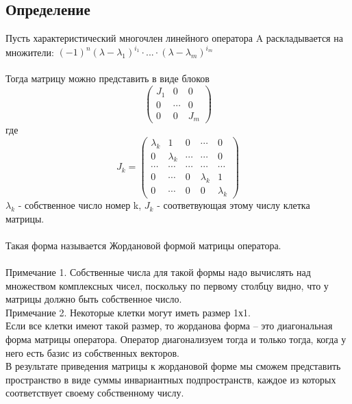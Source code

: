 \documentclass[12pt]{article}
\begin{document}
    \subsection{Определение}

    Пусть характеристический многочлен линейного оператора A раскладывается на множители:
    \((-1)^n(\lambda-\lambda_1)^{i_1}\cdot...\cdot(\lambda-\lambda_m)^{i_m}\)\\\\
    Тогда матрицу можно представить в виде блоков
    \[
        \begin{pmatrix}
            J_1 & 0      & 0   \\
            0   & \cdots & 0   \\
            0   & 0      & J_m
        \end{pmatrix}
    \] где
    \[
        J_k = \begin{pmatrix}
            \lambda_k & 1         & 0      & \cdots    & 0         \\
            0         & \lambda_k & \cdots & \cdots    & 0         \\
            \cdots    & \cdots    & \cdots & \cdots    & \cdots    \\
            0         & \cdots    & 0      & \lambda_k & 1         \\
            0         & \cdots    & 0      & 0         & \lambda_k
        \end{pmatrix}
    \]
$\lambda_k$ - собственное число номер k, $J_k$ - соответвующая этому числу клетка матрицы.\\\\
    Такая форма называется Жордановой формой матрицы оператора. \\\\
    Примечание 1. Собственные числа для такой формы надо вычислять над множеством комплексных чисел,
    поскольку по первому столбцу видно, что у матрицы должно быть собственное число. \\
    Примечание 2. Некоторые клетки могут иметь размер 1х1.\\
    Если все клетки имеют такой размер, то жорданова форма – это диагональная форма матрицы оператора.
    Оператор диагонализуем тогда и только тогда, когда у него есть базис из собственных векторов.\\
    В результате приведения матрицы к жордановой форме мы сможем представить пространство в виде суммы
    инвариантных подпространств, каждое из которых соответствует своему собственному числу.\\\\
\end{document}
